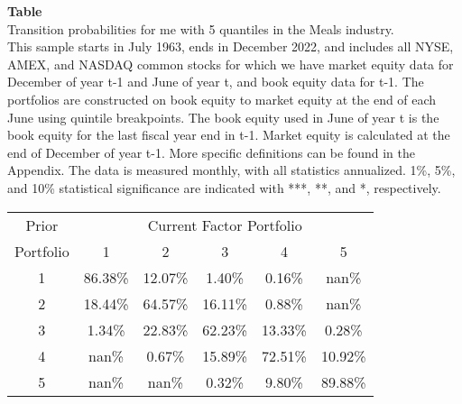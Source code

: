 \begin{table*}[ht!]
\raggedright
{}
\label{tab: transition_probs_me_Meals_with_5_quantiles}
\textbf{Table \thetable} \\
Transition probabilities for me with 5 quantiles in the Meals industry. \\
\hspace*{1em}This sample starts in July 1963, ends in December 2022, and includes all NYSE, AMEX, and NASDAQ common stocks for which we have market equity data for December of year t-1 and June of year t, and book equity data for t-1. The portfolios are constructed on book equity to market equity at the end of each June using quintile breakpoints.  The book equity used in June of year t is the book equity for the last fiscal year end in t-1.  Market equity is calculated at the end of December of year t-1.  More specific definitions can be found in the Appendix.  The data is measured monthly, with all statistics annualized.  1\%, 5\%, and 10\% statistical significance are indicated with ***, **, and *, respectively. \\
\vspace{0.5em}
\centering
\begin{adjustbox}{max width=\textwidth}
\begin{tabular}{@{}cccccc@{}}
\toprule
Prior & \multicolumn{5}{c}{Current Factor Portfolio} \\
Portfolio & 1 & 2 & 3 & 4 & 5 \\
\midrule
1 & 86.38\% & 12.07\% & 1.40\% & 0.16\% & nan\% \\
2 & 18.44\% & 64.57\% & 16.11\% & 0.88\% & nan\% \\
3 & 1.34\% & 22.83\% & 62.23\% & 13.33\% & 0.28\% \\
4 & nan\% & 0.67\% & 15.89\% & 72.51\% & 10.92\% \\
5 & nan\% & nan\% & 0.32\% & 9.80\% & 89.88\% \\
\bottomrule
\end{tabular}
\end{adjustbox}
\end{table*}